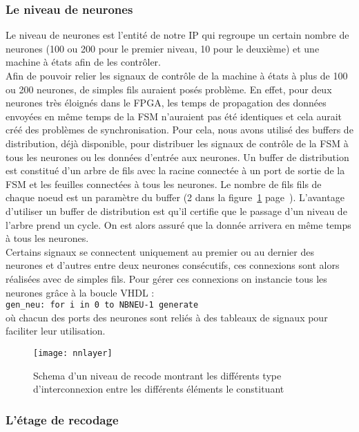 \subsubsection{Le niveau de neurones}
Le niveau de neurones est l'entité de notre IP qui regroupe un certain nombre
de neurones (100 ou 200 pour le premier niveau, 10 pour le deuxième) et une
machine à états afin de les contrôler. \\
Afin de pouvoir relier les signaux de contrôle de la machine à états à plus de
100 ou 200 neurones, de simples fils auraient posés
problème. En effet, pour deux neurones très éloignés dans le FPGA, les temps
de propagation des données envoyées en même temps de la FSM n'auraient pas été
identiques et cela aurait créé des problèmes de synchronisation. Pour cela, nous
avons utilisé des buffers de distribution, déjà disponible, pour distribuer les
signaux de contrôle de la FSM à tous les neurones ou les données d'entrée aux neurones. 
Un buffer de distribution est constitué d'un arbre de fils avec la racine connectée à un port de sortie de la FSM et les feuilles
connectées à tous les neurones. Le nombre de fils fils de chaque noeud est un
paramètre du buffer (2 dans la figure~\ref{fig:nnlayer} page~\pageref{fig:nnlayer}). 
L'avantage d'utiliser un buffer de distribution est qu'il certifie que le passage d'un niveau de l'arbre 
prend un cycle. On est alors assuré que la donnée arrivera en même
temps à tous les neurones. \\
Certains signaux se connectent uniquement au premier ou au dernier des neurones
et d'autres entre deux neurones consécutifs, ces connexions sont alors réalisées avec de simples fils. 
Pour gérer ces connexions on instancie tous les neurones grâce à la boucle VHDL :\\
\texttt{gen\_neu: for i in 0 to NBNEU-1 generate} \\
où chacun des ports des neurones sont reliés à des tableaux de signaux pour
faciliter leur utilisation.

\begin{figure}[h!]
	\texttt{[image: nnlayer]}
	\caption{Schema d'un niveau de recode montrant les différents type 
	d'interconnexion entre les différents éléments le constituant}
	\label{fig:nnlayer}
\end{figure}

\subsubsection{L'étage de recodage}
\label{plan:recode}


